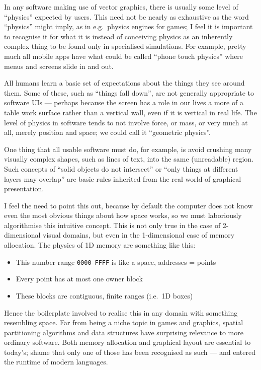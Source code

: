 In any software making use of vector graphics, there is usually some
level of ``physics'' expected by users. This need not be nearly as
exhaustive as the word ``physics'' might imply, as in e.g.~physics
engines for games; I feel it is important to recognise it for what it is
instead of conceiving physics as an inherently complex thing to be found
only in specialised simulations. For example, pretty much all mobile
apps have what could be called ``phone touch physics'' where menus and
screens slide in and out.

All humans learn a basic set of expectations about the things they see
around them. Some of these, such as ``things fall down'', are not
generally appropriate to software UIs --- perhaps because the screen has
a role in our lives a more of a table work surface rather than a
vertical wall, even if it is vertical in real life. The level of physics
in software tends to not involve force, or mass, or very much at all,
merely position and space; we could call it ``geometric physics''.

One thing that all usable software must do, for example, is avoid
crushing many visually complex shapes, such as lines of text, into the
same (unreadable) region. Such concepts of ``solid objects do not
intersect'' or ``only things at different layers may overlap'' are basic
rules inherited from the real world of graphical presentation.

I feel the need to point this out, because by default the computer does
not know even the most obvious things about how space works, so we must
laboriously algorithmise this intuitive concept. This is not only true
in the case of 2-dimensional visual domains, but even in the
1-dimensional case of memory allocation. The physics of 1D memory are
something like this:

\begin{itemize}
\tightlist
\item
  This number range \texttt{0000}--\texttt{FFFF} is like a space,
  addresses = points
\item
  Every point has at most one owner block
\item
  These blocks are contiguous, finite ranges (i.e.~1D boxes)
\end{itemize}

Hence the boilerplate involved to realise this in any domain with
something resembling space. Far from being a niche topic in games and
graphics, spatial partitioning algorithms and data structures have
surprising relevance to more ordinary software. Both memory allocation
and graphical layout are essential to today's; shame that only one of
those has been recognised as such --- and entered the runtime of modern
languages.

